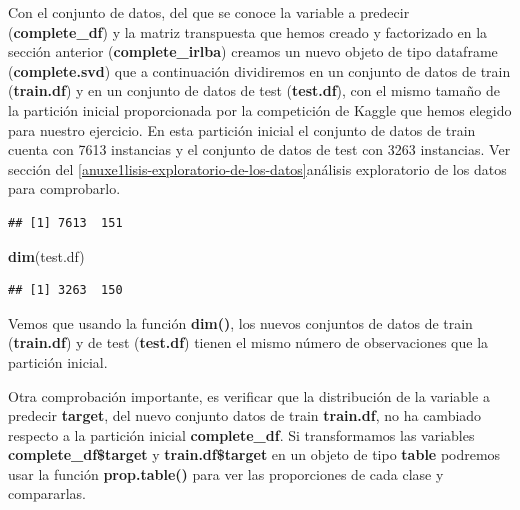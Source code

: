 \documentclass[]{article}
\newenvironment{Shaded}{\begin{snugshade}}{\end{snugshade}}
\newcommand{\DataTypeTok}[1]{\textcolor[rgb]{0.13,0.29,0.53}{#1}}
\newcommand{\DecValTok}[1]{\textcolor[rgb]{0.00,0.00,0.81}{#1}}
\newcommand{\KeywordTok}[1]{\textcolor[rgb]{0.13,0.29,0.53}{\textbf{#1}}}
\newcommand{\NormalTok}[1]{#1}
\newcommand{\OperatorTok}[1]{\textcolor[rgb]{0.81,0.36,0.00}{\textbf{#1}}}
\newcommand{\StringTok}[1]{\textcolor[rgb]{0.31,0.60,0.02}{#1}}
\begin{document}
Con el conjunto de datos, del que se conoce la variable a predecir (\textbf{complete\_df}) y la matriz transpuesta que hemos creado y factorizado en la sección anterior (\textbf{complete\_irlba}) creamos un nuevo objeto de tipo dataframe (\textbf{complete.svd}) que a continuación dividiremos en un conjunto de datos de train (\textbf{train.df}) y en un conjunto de datos de test (\textbf{test.df}), con el mismo tamaño de la partición inicial proporcionada por la competición de Kaggle que hemos elegido para nuestro ejercicio. En esta partición inicial el conjunto de datos de train cuenta con 7613
instancias y el conjunto de datos de test con 3263 instancias. Ver sección del \ref{anuxe1lisis-exploratorio-de-los-datos}{análisis exploratorio de los datos} para comprobarlo.

\begin{Shaded}
\end{Shaded}

\begin{verbatim}
## [1] 7613  151
\end{verbatim}

\begin{Shaded}
\begin{Highlighting}[]
\KeywordTok{dim}\NormalTok{(test.df)}
\end{Highlighting}
\end{Shaded}

\begin{verbatim}
## [1] 3263  150
\end{verbatim}

Vemos que usando la función \textbf{dim()}, los nuevos conjuntos de datos de train (\textbf{train.df}) y de test (\textbf{test.df}) tienen el mismo número de observaciones que la partición inicial.

Otra comprobación importante, es verificar que la distribución de la variable a predecir \textbf{target}, del nuevo conjunto datos de train \textbf{train.df}, no ha cambiado respecto a la partición inicial \textbf{complete\_df}. Si transformamos las variables \textbf{complete\_df\$target} y \textbf{train.df\$target} en un objeto de tipo \textbf{table} podremos usar la función \textbf{prop.table()} para ver las proporciones de cada clase y compararlas.
\end{document}

